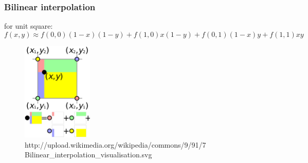 \documentclass{beamer}
\begin{document}
\begin{frame}
 \frametitle{Bilinear interpolation}
 for unit square:
 \begin{equation*}
  f(x,y) \approx f(0,0)(1-x)(1-y) + f(1,0)x(1-y) + f(0,1)(1-x)y + f(1,1)xy
 \end{equation*}

 \begin{figure}[H]
  \centering
  \includegraphics[width=0.3\textwidth]{bilinear_interpolation_visualisation.png}
  \caption{http://upload.wikimedia.org/wikipedia/commons/9/91/7
	   Bilinear\_interpolation\_visualisation.svg} %
\end{figure}
\end{frame}
\end{document}
